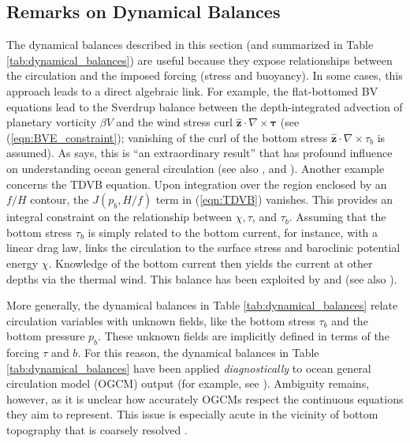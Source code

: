 \documentclass{ametsocV6.2}
\begin{document}
\subsection{Remarks on Dynamical Balances}
The dynamical balances described in this section (and summarized in Table \ref{tab:dynamical_balances}) are useful because they expose relationships between the circulation and the imposed forcing (stress and buoyancy).
In some cases, this approach leads to a direct algebraic link.
For example, the flat-bottomed BV equations lead to the Sverdrup balance between the depth-integrated advection of planetary vorticity $\beta V$ and the wind stress curl $\hat{\mathbf{z}} \cdot \nabla \times \boldsymbol{\tau}$ (see (\ref{eqn:BVE_constraint}); vanishing of the curl of the bottom stress $\hat{\mathbf{z}} \cdot \nabla \times \tau_b$ is assumed).
As \citet{pedlosky96} says, this is ``an extraordinary result'' that has profound influence on understanding ocean general circulation (see also \citealt{pedlosky87b,vallis06}, and \citealt{klinger&haine19}).
Another example concerns the TDVB equation.
Upon integration over the region enclosed by an $f/H$ contour, the $J(p_b,H/f)$ term in (\ref{eqn:TDVB}) vanishes.
This provides an integral constraint on the relationship between $\chi, \tau$, and $\tau_b$.
Assuming that the bottom stress $\tau_b$ is simply related to the bottom current, for instance, with a linear drag law, links the circulation to the surface stress and baroclinic potential energy $\chi$. 
Knowledge of the bottom current then yields the current at other depths via the thermal wind.
This balance has been exploited by \citet{nost&isachsen03,nilsson_etal05,nilsson_etal24} and \citet{aaboe&nost08} (see also \citealt{timmermans&marshall20}).

More generally, the dynamical balances in Table \ref{tab:dynamical_balances} relate circulation variables with unknown fields, like the bottom stress $\tau_b$ and the bottom pressure $p_b$.
These unknown fields are implicitly defined in terms of the forcing $\tau$ and $b$.
For this reason, the dynamical balances in Table \ref{tab:dynamical_balances} have been applied \emph{diagnostically} to ocean general circulation model (OGCM) output (for example, see \citealt{hughes&killworth95, borowski_etal02,lecorre_etal20,waldman&giordani23}).
Ambiguity remains, however, as it is unclear how accurately OGCMs respect the continuous equations they aim to represent.
This issue is especially acute in the vicinity of bottom topography that is coarsely resolved \citep{styles_etal22}.
\end{document}
